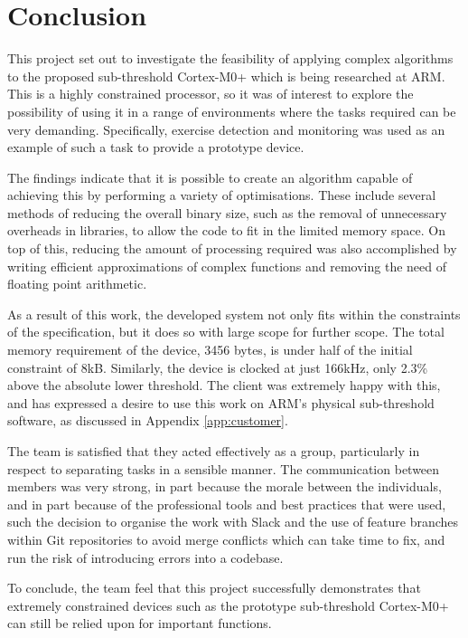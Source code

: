 \chapter{Conclusion}

This project set out to investigate the feasibility of applying complex algorithms to the proposed sub-threshold Cortex-M0+ which is being researched at ARM. This is a highly constrained processor, so it was of interest to explore the possibility of using it in a range of environments where the tasks required can be very demanding. Specifically, exercise detection and monitoring was used as an example of such a task to provide a prototype device.

The findings indicate that it is possible to create an algorithm capable of achieving this by performing a variety of optimisations. These include several methods of reducing the overall binary size, such as the removal of unnecessary overheads in libraries, to allow the code to fit in the limited memory space. On top of this, reducing the amount of processing required was also accomplished by writing efficient approximations of complex functions and removing the need of floating point arithmetic.

As a result of this work, the developed system not only fits within the constraints of the specification, but it does so with large scope for further scope. The total memory requirement of the device, 3456 bytes, is under half of the initial constraint of 8kB. Similarly, the device is clocked at just 166kHz, only 2.3\% above the absolute lower threshold. The client was extremely happy with this, and has expressed a desire to use this work on ARM's physical sub-threshold software, as discussed in Appendix \ref{app:customer}.

The team is satisﬁed that they acted effectively as a group, particularly in respect to separating tasks in a sensible manner. The communication between members was very strong, in part because the morale between the individuals, and in part because of the professional tools and best practices that were used, such the decision to organise the work with Slack and the use of feature branches within Git repositories to avoid merge conflicts which can take time to fix, and run the risk of introducing errors into a codebase.

To conclude, the team feel that this project successfully demonstrates that extremely constrained devices such as the prototype sub-threshold Cortex-M0+ can still be relied upon for important functions.
